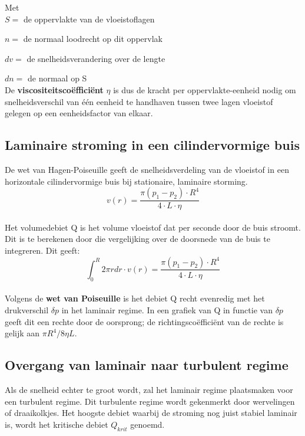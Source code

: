 Met
\\

$S=$ de oppervlakte van de vloeistoflagen

$n=$ de normaal loodrecht op dit oppervlak

$dv=$ de snelheidsverandering over de lengte

$dn=$ de normaal op S
\\

De \textbf{viscositeitsco\"effici\"ent} $\eta$ is dus de kracht per oppervlakte-eenheid nodig 
om snelheidsverschil van \'e\'en eenheid te handhaven tussen twee lagen vloeistof gelegen 
op een eenheidsfactor van elkaar.

\subsection{Laminaire stroming in een cilindervormige buis}

De wet van Hagen-Poiseuille geeft de snelheidsverdeling van de vloeistof 
in een horizontale cilindervormige buis bij stationaire, laminaire storming.
\\

$$v(r) = \frac{\pi(p_{1}-p_{2}) \cdot R^4}{4 \cdot L \cdot \eta}$$
\\
Het volumedebiet Q is het volume vloeistof dat per seconde door de buis stroomt.
Dit is te berekenen door die vergelijking over de doorsnede van de buis te integreren. 
Dit geeft: 
\\

$$\int_0^R2 \pi rdr \cdot v(r) = \frac{\pi(p_{1} - p_{2})\cdot R^4}{4 \cdot L \cdot \eta} $$
\\

Volgens de \textbf{wet van Poiseuille} is het debiet Q recht evenredig met het 
drukverschil $\delta p$ in het laminair regime. In een grafiek van Q in functie
van $\delta p$ geeft dit een rechte door de oorsprong; de richtingsco\"effici\"ent van de rechte is gelijk aan $\pi R^4 / 8\eta L$.
\\

\subsection{Overgang van laminair naar turbulent regime}

Als de snelheid echter te groot wordt, zal het laminair regime plaatsmaken voor een turbulent regime. 
Dit turbulente regime wordt gekenmerkt door wervelingen of draaikolkjes. Het hoogste
debiet waarbij de stroming nog juist stabiel laminair is, wordt het kritische debiet
$Q_{krit}$ genoemd.

